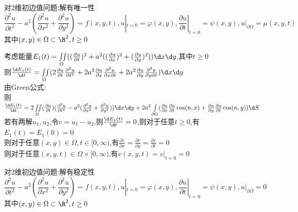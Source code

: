 \begin{dingli*}
对$2$维初边值问题:解有唯一性
\[\frac{\partial^2 u}{\partial t^2}-a^2(\frac{\partial^2 u}{\partial x^2}+\frac{\partial^2 u}{\partial y^2})=f(x,y,t),u|_{t=0}=\varphi(x,y),\frac{\partial u}{\partial t}|_{t=0}=\psi(x,y),u|_{\partial\Omega}=\mu(x,y,t)\]
其中$(x,y)\in\Omega \subset\R^2,t\geq 0$
\end{dingli*}

\begin{jie}
考虑能量$E_1(t)=\iint\limits_{\Omega}((\frac{\partial u}{\partial t})^2+a^2((\frac{\partial u}{\partial x})^2+(\frac{\partial u}{\partial y})^2))\d x\d y$,其中$t\geq 0$\\
则$\frac{\d E_1(t)}{\d t}=\iint\limits_{\Omega}(2\frac{\partial u}{\partial t}\frac{\partial^2 u}{\partial t^2}+2a^2\frac{\partial u}{\partial x}\frac{\partial^2 u}{\partial x\partial t}+2a^2\frac{\partial u}{\partial y}\frac{\partial^2 u}{\partial y\partial t})\d x\d y$\\
由Green公式:\\
则$\frac{\d E_1(t)}{\d t}=2\iint\limits_{\Omega}(\frac{\partial u}{\partial t})(\frac{\partial^2 u}{\partial t^2}-a^2(\frac{\partial^2 u}{\partial x^2}+\frac{\partial^2 u}{\partial y^2}))\d x\d y+2a^2\int\limits_{\partial\Omega}(\frac{\partial u}{\partial x}\frac{\partial u}{\partial t}\cos(n,x)+\frac{\partial u}{\partial y}\frac{\partial u}{\partial t}\cos(n,y))\d S$\\
若有两解$u_1,u_2$,令$v=u_1-u_2$,则$\frac{\d E_1(t)}{\d t}=0$,则对于任意$t\geq 0$,有$E_1(t)=E_1(0)=0$\\
则对于任意$(x,y)\in \Omega,t\in[0,\infty)$,有$\frac{\partial v}{\partial x}=\frac{\partial v}{\partial y}=\frac{\partial v}{\partial t}=0$\\
则对于任意$(x,y,t)\in \Omega\times[0,\infty)$,有$v(x,y,t)=v|_{t=0}=0$
\end{jie}

\begin{dingli*}
对$2$维初边值问题:解有稳定性
\[\frac{\partial^2 u}{\partial t^2}-a^2(\frac{\partial^2 u}{\partial x^2}+\frac{\partial^2 u}{\partial y^2})=f(x,y,t),u|_{t=0}=\varphi(x,y),\frac{\partial u}{\partial t}|_{t=0}=\psi(x,y),u|_{\partial\Omega}=0\]
其中$(x,y)\in\Omega \subset\R^2,t\geq 0$
\end{dingli*}

